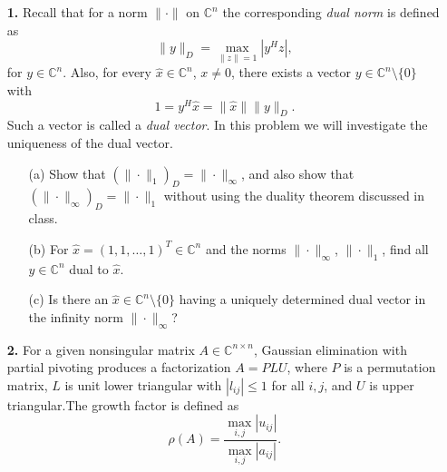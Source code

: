 \documentclass[10pt]{report}
\begin{document}
\begin{enumerate}
    
\item[\textbf{1.}] Recall that for a norm $\|\cdot\|$ on $\mathbb{C}^n$ the corresponding \textit{dual norm} is defined as \[\| y \|_D= \max_{\|z\|=1} |y^Hz|,\]
for $y \in \mathbb{C}^n$. Also, for every $\hat{x} \in \mathbb{C}^n$, $x \neq 0$, there exists a vector $y \in \mathbb{C}^n \setminus \{0\}$ with
\[1 = y^H \hat{x} = \|\hat{x}\|\|y\|_D.\] 
Such a vector is called a \textit{dual vector}. In this problem we will investigate the uniqueness of the dual vector.
  \begin{enumerate}
    \item[(a)] Show that $(\|\cdot\|_1)_D=\|\cdot\|_{\infty}$, and also show that
      $(\|\cdot\|_{\infty})_D=\|\cdot\|_{1}$ without using the duality theorem discussed in class.

  \item[(b)] For $\hat{x}= (1, 1, \ldots, 1)^T \in \mathbb{C}^{n}$ and the norms $\| \cdot \|_{\infty}$, $\| \cdot \|_{1}$, find all $y\in\mathbb{C}^{n}$ dual to $\hat{x}$. 

    \item[(c)] Is there an $\hat{x}\in\mathbb{C}^{n}\setminus\{0\}$ having a uniquely determined dual vector in the infinity norm $\|\cdot\|_{\infty}$?
  \end{enumerate}

\vspace{0.1cm} 

\item[\textbf{2.}] For a given nonsingular matrix $A\in\mathbb{C}^{n\times n}$, Gaussian elimination with partial pivoting produces a factorization $A=PLU$, where $P$ is a permutation matrix, $L$ is unit lower triangular with $|l_{ij}|\leq1$ for all $i,j$, and $U$ is upper triangular.The growth factor is defined as\[\rho(A)=\frac{\max_{i,j}|u_{ij}|}{\max_{i,j}|a_{ij}|}.\]


\end{enumerate}
\end{document}
